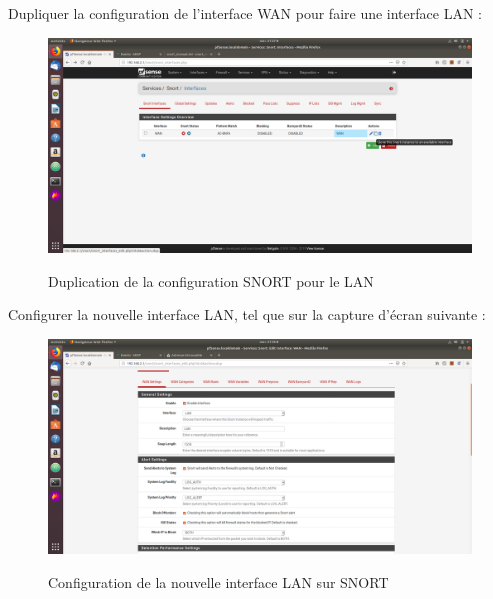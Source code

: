 Dupliquer la configuration de l'interface WAN pour faire une interface LAN :
\begin{figure}[h!]
    \begin{center}
        \includegraphics[scale=0.31]{MISP_Screenshots/Snort/11.png}
        \label{MISP_Screenshots/Snort/11}
        \caption{Duplication de la configuration SNORT pour le LAN}
    \end{center}
\end{figure}
\FloatBarrier

\pagebreak

Configurer la nouvelle interface LAN, tel que sur la capture d'écran suivante :
\begin{figure}[h!]
    \begin{center}
        \includegraphics[scale=0.33]{MISP_Screenshots/Snort/12.png}
        \label{MISP_Screenshots/Snort/12}
        \caption{Configuration de la nouvelle interface LAN sur SNORT}
    \end{center}
\end{figure}
\FloatBarrier

